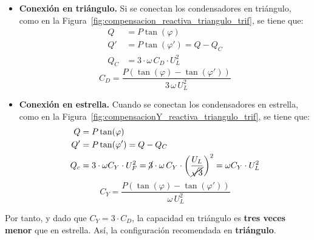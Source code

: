 \begin{itemize}
\item \textbf{Conexión en triángulo.} Si se conectan los condensadores
  en triángulo, como en la
  Figura~\ref{fig:compensacion_reactiva_triangulo_trif}, se tiene que:
  \begin{align*}
    Q &= P\tan(\varphi)\\
    Q' &= P\tan(\varphi') = Q - Q_C\\
    Q_C &= 3 \cdot \omega\, C_D \cdot U_L^2
  \end{align*}
  \begin{equation}
    \boxed{C_D = \frac{P(\tan (\varphi) - \tan (\varphi'))}{3\,\omega\, U_L^2}}
  \end{equation}
\item \textbf{Conexión en estrella.} Cuando se conectan los
  condensadores en estrella, como en la
  Figura~\ref{fig:compensacionY_reactiva_triangulo_trif}, se tiene
  que:
  \begin{align*}
    Q &= P\tan(\varphi)\\
    Q' &= P\tan(\varphi') = Q - Q_C\\
    Q_c &= 3 \cdot \omega C_Y \cdot U_F^2 = \cancel{3} \cdot \omega \,C_Y \cdot \left(\dfrac{U_L}{\cancel{\sqrt{3}}}\right)^2=\omega C_Y \cdot U_L^2
  \end{align*}
  \begin{equation}
    \boxed{C_Y = \frac{P(\tan (\varphi) - \tan (\varphi'))}{\omega\, U_L^2}}
  \end{equation}
\end{itemize}
		
		
		
Por tanto, y dado que $C_Y = 3 \cdot C_D$, la capacidad en triángulo
es \textbf{tres veces menor} que en estrella. Así, la configuración
recomendada en \textbf{triángulo}.
		
